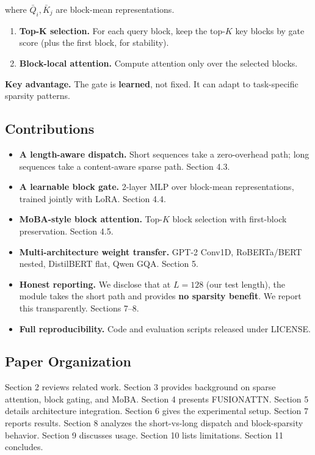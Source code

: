 where $\bar{Q}_i, \bar{K}_j$ are block-mean representations.

\begin{enumerate}
\item \textbf{Top-K selection.} For each query block, keep the top-$K$ key blocks
  by gate score (plus the first block, for stability).
\item \textbf{Block-local attention.} Compute attention only over the selected
  blocks.

\end{enumerate}
\textbf{Key advantage.} The gate is \textbf{learned}, not fixed. It can adapt to 
task-specific sparsity patterns.

\subsection{Contributions}

\begin{itemize}
\item \textbf{A length-aware dispatch.} Short sequences take a zero-overhead path;
  long sequences take a content-aware sparse path. Section 4.3.
\item \textbf{A learnable block gate.} 2-layer MLP over block-mean representations,
  trained jointly with LoRA. Section 4.4.
\item \textbf{MoBA-style block attention.} Top-$K$ block selection with first-block
  preservation. Section 4.5.
\item \textbf{Multi-architecture weight transfer.} GPT-2 Conv1D, RoBERTa/BERT nested,
  DistilBERT flat, Qwen GQA. Section 5.
\item \textbf{Honest reporting.} We disclose that at $L = 128$ (our test length), the
  module takes the short path and provides \textbf{no sparsity benefit}. We
  report this transparently. Sections 7--8.
\item \textbf{Full reproducibility.} Code and evaluation scripts released under
  {{LICENSE}}.

\end{itemize}
\subsection{Paper Organization}

Section 2 reviews related work. Section 3 provides background on sparse 
attention, block gating, and MoBA. Section 4 presents FUSIONATTN. Section 
5 details architecture integration. Section 6 gives the experimental 
setup. Section 7 reports results. Section 8 analyzes the short-vs-long 
dispatch and block-sparsity behavior. Section 9 discusses usage. Section 
10 lists limitations. Section 11 concludes.



